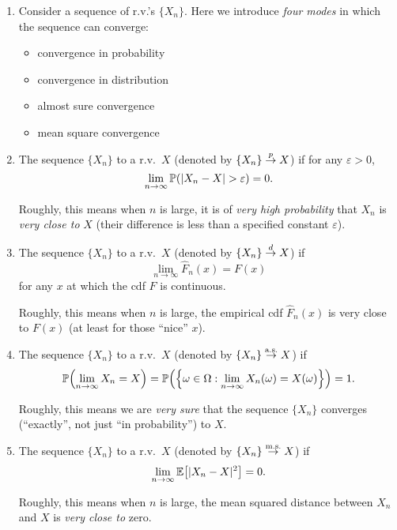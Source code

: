 \begin{enumerate}
\item Consider a sequence of r.v.'s \(\{X_n\}\). Here we introduce \emph{four
modes} in which the sequence can converge:
\begin{itemize}
\item convergence in probability
\item convergence in distribution
\item almost sure convergence
\item mean square convergence
\end{itemize}
\item The sequence \(\{X_n\}\)  to a r.v.\ \(X\)
(denoted by \(\{X_n\}\overset{p}{\to} X\)) if for any \(\varepsilon>0\),
\[
\lim_{n\to \infty}\mathbb{P}\qty(|X_n-X| >\varepsilon)=0.
\]
\begin{note}
Roughly, this means when \(n\) is large, it is of \emph{very high probability}
that \(X_n\) is \emph{very close to} \(X\) (their difference is less than a
specified constant \(\varepsilon\)).
\end{note}

\item The sequence \(\{X_n\}\)  to a r.v.\ \(X\)
(denoted by \(\{X_n\}\overset{d}{\to} X\)) if
\[
\lim_{n\to \infty}\widehat{F}_{n}(x)=F(x)
\]
for any \(x\) at which the cdf \(F\) is continuous.

\begin{note}
Roughly, this means when \(n\) is large, the empirical cdf
\(\widehat{F}_{n}(x)\) is very close to \(F(x)\) (at least for those ``nice''
\(x\)).
\end{note}

\item The sequence \(\{X_n\}\)  to a r.v.\ \(X\)
(denoted by \(\{X_n\}\overset{\text{a.s.}}{\to} X\)) if
\[
\mathbb{P}\qty(\lim_{n\to \infty}X_n=X)
=\mathbb{P}\qty(\qty{\omega\in\Omega:\lim_{n\to \infty}X_n(\omega)=X(\omega)})
=1.
\]

\begin{note}
Roughly, this means we are \emph{very sure} that the sequence \(\{X_n\}\)
converges (``exactly'', not just ``in probability'') to \(X\).
\end{note}

\item The sequence \(\{X_n\}\)  to a r.v.\ \(X\)
(denoted by \(\{X_n\}\overset{\text{m.s.}}{\to} X\)) if
\[
\lim_{n\to \infty}\mathbb{E}\qty[|X_n-X|^2]=0.
\]
\begin{note}
Roughly, this means when \(n\) is large, the mean squared distance between
\(X_n\) and \(X\) is \emph{very close to} zero.
\end{note}


\end{enumerate}
